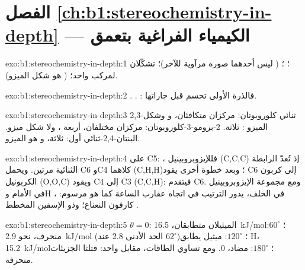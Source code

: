 \section*{الفصل \ref{ch:b1:stereochemistry-in-depth} --- الكيمياء الفراغية بتعمق}

\begin{solution}{exo:b1:stereochemistry-in-depth:1}
؛ ؛  ( ليس أحدهما
صورة مرآوية للآخر)؛ تشكّلان لمركب واحد؛ 
( هو شكل الميزو).
\end{solution}

\begin{solution}{exo:b1:stereochemistry-in-depth:2}
.
. : فالذرة الأولى تحسم قبل جاراتها.
\end{solution}

\begin{solution}{exo:b1:stereochemistry-in-depth:3}
2,3-ثنائي كلوروبوتان: مركزان متكافئان،  و
وشكل الميزو : ثلاثة. 2-برومو-3-كلوروبوتان: مركزان مختلفان،
أربعة ، ولا شكل ميزو. البنتان-2,4-ثنائي أول: ثلاثة، و
هو الميزو.
\end{solution}

\begin{solution}{exo:b1:stereochemistry-in-depth:4}
على C5: ، فللإيزوبروبينيل (C,C,C) إذ تُعدّ الرابطة الثنائية مرتين. ويحمل C6 وC4 كلاهما (C,H,H)؛ وبعد خطوة أخرى يقود C6 إلى
كربون الكربونيل (O,O,C) ويقود C4 إلى C3 (C,C,H): فيتقدم C6. ومع مجموعة الإيزوبروبينيل
في الأمام وH في الخلف، يدور الترتيب 
في اتجاه عقارب الساعة كما هو مرسوم: ، كارفون النعناع؛ وذو الإسفين المخطط
.
\end{solution}

\begin{solution}{exo:b1:stereochemistry-in-depth:5}
$\theta = 0$: الميثيلان متطابقان، \qty{16.5}{kJ/mol}؛ $60^\circ$: منحرف، نحو
\qty{2.9}{kJ/mol} (الحد الأدنى 2.8 عند $62^\circ$)؛ $120^\circ$: ميثيل يطابق H،
\qty{15.2}{kJ/mol}؛ $180^\circ$: مضاد، 0. ومع تساوي الطاقات،  مقابل  واحد: فثلثا الجزيئات منحرفة.
\end{solution}

